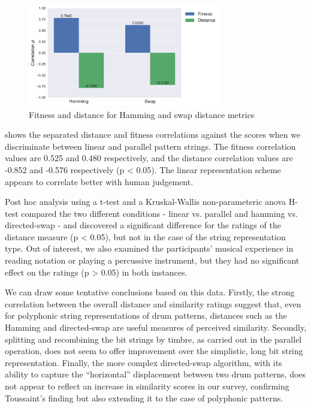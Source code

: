 {{\begin{figure}
	\begin{center}
		\includegraphics[width=0.75\textwidth]{ch03_symbolic/figures/measure_bar.pdf}
	\end{center}
	\caption[Fitness and distance for Hamming and swap distance metrics]{Fitness and distance for Hamming and swap distance metrics}
	\label{fig:hamming_versus_swap}
\end{figure}

 shows the separated distance and fitness correlations against the scores when we discriminate between linear and parallel pattern strings. The fitness correlation values are 0.525 and 0.480 respectively, and the distance correlation values are -0.852 and -0.576 respectively (p < 0.05). The linear representation scheme appears to correlate better with human judgement.

Post hoc analysis using a t-test and a Kruskal-Wallis non-parameteric \acrshort{anova} H-test compared the two different conditions - linear vs. parallel and hamming vs. directed-swap - and discovered a significant difference for the ratings of the distance measure (p < 0.05), but not in the case of the string representation type. Out of interest, we also examined the participants' musical experience in reading notation or playing a percussive instrument, but they had no significant effect on the ratings (p > 0.05) in both instances.

We can draw some tentative conclusions based on this data. Firstly, the strong correlation between the overall distance and similarity ratings suggest that, even for polyphonic string representations of drum patterns, distances such as the Hamming and directed-swap are useful measures of perceived similarity. Secondly, splitting and recombining the bit strings by timbre, as carried out in the parallel operation, does not seem to offer improvement over the simplistic, long bit string representation. Finally, the more complex directed-swap algorithm, with its ability to capture the ``horizontal'' displacement between two drum patterns, does not appear to reflect an increase in similarity scores in our survey, confirming Toussaint's finding but also extending it to the case of polyphonic patterns.

}}
